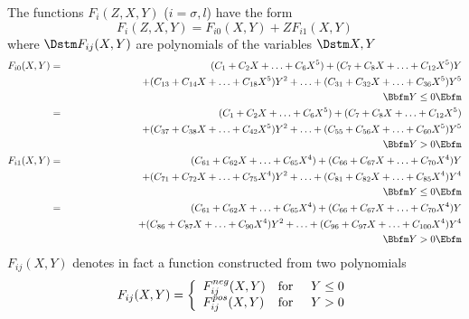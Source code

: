The functions $F_i(Z,X,Y)$ ($ i=\sigma,l $) have the form
\begin{equation}
 F_i(Z,X,Y) = F_{i0}(X,Y)+ZF_{i1}(X,Y)
\end{equation}
where $\Dstm F_{ij}(X,Y)$ are polynomials of the variables $\Dstm X,Y$
\begin{eqnarray}
F_{i0}(X,Y) & = &  (C_1+C_2X+\ldots+C_6X^5)+(C_7+C_8X+\ldots+C_{12}X^5)Y
                                                             \nonumber \\
          &   & +(C_{13}+C_{14}X+\ldots + C_{18}X^5)Y^2+\ldots
                +(C_{31}+C_{32}X+\ldots+C_{36}X^5)Y^5                  \\
          &   & \mbox{\hspace{11cm}} \Bbfm Y\leq 0  \Ebfm    \nonumber \\
          & = &  (C_1+C_2X+\ldots+C_6X^5)+(C_7+C_8X+\ldots+C_{12}X^5)
                                                             \nonumber \\
          &   & +(C_{37}+C_{38}X+\ldots+C_{42}X^5)Y^2+\ldots+
                 (C_{55}+C_{56}X+\ldots+C_{60}X^5)Y^5        \nonumber \\
          &   & \mbox{\hspace{11cm}} \Bbfm Y > 0\Ebfm        \nonumber \\
F_{i1}(X,Y) & = &  (C_{61}+C_{62}X+\ldots+C_{65}X^4)
                +(C_{66}+C_{67}X+\ldots+C_{70}X^4)Y          \nonumber \\
          &   & +(C_{71}+C_{72}X+\ldots+C_{75}X^4)Y^2+\ldots
                +(C_{81}+C_{82}X+\ldots+C_{85}X^4) Y^4                 \\
          &   &   \mbox{\hspace{11cm}} \Bbfm Y\leq 0\Ebfm    \nonumber \\
          & = &  (C_{61}+C_{62}X+\ldots+C_{65}X^4)
                +(C_{66}+C_{67}X+\ldots+C_{70}X^4)Y          \nonumber \\
          &   & +(C_{86}+C_{87}X+\ldots+C_{90}X^4)Y^2+\ldots
                +(C_{96}+C_{97}X+\ldots+C_{100}X^4)Y^4       \nonumber  \\
          &   &  \mbox{\hspace{11cm}} \Bbfm Y>0 \Ebfm        \nonumber \\
\end{eqnarray}
$F_{ij}(X,Y)$ denotes in fact a function constructed from two
polynomials
\[
F_{ij}(X,Y) = \left \{
\begin{array}{ll}
F_{ij}^{neg}(X,Y) & \mbox{for\hspace{0.5cm}} Y\leq 0 \\
F_{ij}^{pos}(X,Y) & \mbox{for\hspace{0.5cm}} Y>0   
\end{array} \right .
\]
